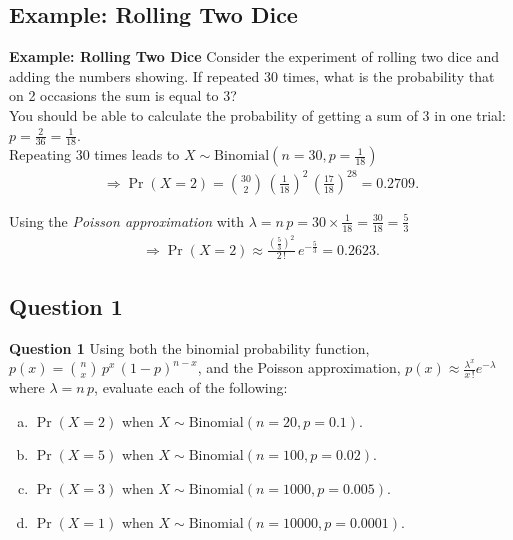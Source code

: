 \documentclass[compress]{beamer}        %
\makeatletter
\newcommand{\tcb}{\textcolor{beamer@blendedblue}}
\makeatother
\begin{document}
\subsection{Example: Rolling Two Dice}
\begin{frame}{\bf \tcb{Example: Rolling Two Dice}}
Consider the experiment of rolling two dice and adding the numbers showing. If repeated 30 times, what is the probability that on 2 occasions the sum is equal to 3?\\[0.4cm]

You should be able to calculate the probability of getting a sum of 3 in one trial: $p = \frac{2}{36} = \frac{1}{18}$.\\[0.4cm]

Repeating 30 times leads to $X \sim \text{Binomial}(n=30, p=\frac{1}{18})$
\begin{align*}
\Rightarrow \Pr(X = 2) = \binom{30}{2} \, \left(\frac{1}{18}\right)^{2} \, \left(\frac{17}{18}\right)^{28} = 0.2709.
\end{align*}

Using the \emph{Poisson approximation} with $\lambda = n\,p = 30\times\frac{1}{18} = \frac{30}{18} = \frac{5}{3}$
\begin{align*}
\Rightarrow \Pr(X = 2) \approx \frac{(\frac{5}{3})^{2}}{2\,!}\, e^{-\frac{5}{3}} = 0.2623.
\end{align*}

\end{frame}



\subsection{Question 1}
\begin{frame}{\bf \tcb{Question 1}}
Using both the binomial probability function, $p(x) = \binom{n}{x} \, p^x\,(1-p)^{n-x}$, and the Poisson approximation, $p(x) \approx \frac{\lambda^x}{x\,!} e^{-\lambda}$ where $\lambda = n\,p$, evaluate each of the following:\\[0.3cm]
\begin{enumerate}[a)]\itemsep0.5cm
\item $\Pr(X=2)$ when $X \sim \text{Binomial}(n=20,p=0.1)$.
\item $\Pr(X=5)$ when $X \sim \text{Binomial}(n=100,p=0.02)$.
\item $\Pr(X=3)$ when $X \sim \text{Binomial}(n=1000,p=0.005)$.
\item $\Pr(X=1)$ when $X \sim \text{Binomial}(n=10000,p=0.0001)$.
\end{enumerate}

\end{frame}
\end{document}
